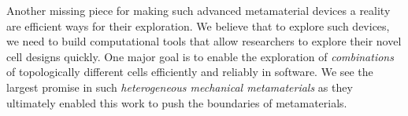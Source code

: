 Another missing piece for making such advanced metamaterial devices a reality are efficient ways for their exploration. We believe that to explore such devices, we need to build computational tools that allow researchers to explore their novel cell designs quickly. One major goal is to enable the exploration of \textit{combinations} of topologically different cells efficiently and reliably in software. We see the largest promise in such \textit{heterogeneous mechanical metamaterials} as they ultimately enabled this work to push the boundaries of metamaterials. 





